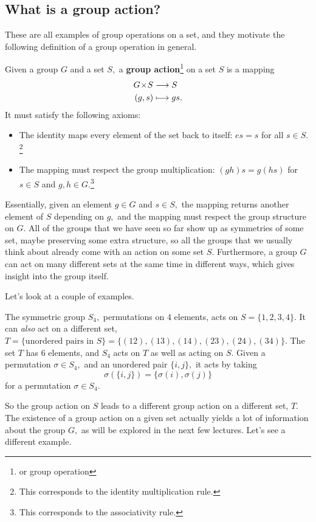 \subsection{What is a group action?}
These are all examples of group operations on a set, and they motivate the following definition of a group operation in general.
\begin{definition}
Given a group $G$ and a set $S,$ a \textbf{group action}\footnote{or group operation} on a set $S$ is a mapping 
\begin{align*}
    G \hspace{0.05em}{\times}\hspace{0.05em} S &\longrightarrow S \\
    (g, s) &\longmapsto gs.
\end{align*}
It must satisfy the following axioms:
\begin{itemize}
    \item The identity maps every element of the set back to itself: $es = s$ for all $s \in S.$\footnote{This corresponds to the identity multiplication rule.}
    \item The mapping must respect the group multiplication: $(gh)s = g(hs)$ for $s \in S$ and $g, h \in G.$\footnote{This corresponds to the associativity rule.}
\end{itemize}
\end{definition}

Essentially, given an element $g \in G$ and $s \in S,$ the mapping returns another element of $S$ depending on $g,$ and the mapping must respect the group structure on $G.$ All of the groups that we have seen so far show up as symmetries of some set, maybe preserving some extra structure, so all the groups that we usually think about already come with an action on some set $S.$ Furthermore, a group $G$ can act on many different sets at the same time in different ways, which gives insight into the group itself.

Let's look at a couple of examples.
\begin{example}[$S_4$]
The symmetric group $S_4,$ permutations on 4 elements, acts on $S = \{1, 2, 3, 4\}$. It can \emph{also} act on a different set, $T = \{\text{unordered pairs in } S \} = \{(12),(13), (14), (23), (24), (34)\}.$ The set $T$ has 6 elements, and $S_4$ acts on $T$ as well as acting on $S.$ Given a permutation $\sigma \in S_4,$ and an unordered pair $\{i, j\},$ it acts by taking
\[
\sigma(\{i, j\}) = \{\sigma(i), \sigma(j)\}
\]
for a permutation $\sigma \in S_4.$ 
\end{example}

So the group action on $S$ leads to a different group action on a different set, $T.$ The existence of a group action on a given set actually yields a lot of information about the group $G,$ as will be explored in the next few lectures. Let's see a different example.

